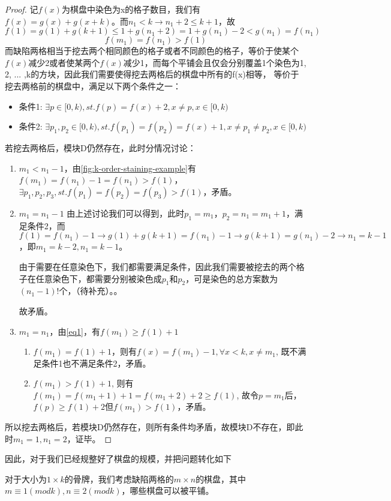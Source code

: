 \begin{proof}
    记$f(x)$为棋盘中染色为x的格子数目，我们有$f(x) = g(x) + g(x + k)$。而$n_1 < k \rightarrow n_1 + 2 \le k + 1$，故
    $f(1) = g(1) + g(k + 1) \le 1 + g(n_1 + 2) = 1 + g(n_1) - 2 < g(n_1) = f(n_1)$
    \begin{equation}
        \label{eq1}
        f(m_1) = f(n_1) > f(1)
    \end{equation}
    而缺陷两格相当于挖去两个相同颜色的格子或者不同颜色的格子，等价于使某个$f(x)$减少2或者使某两个$f(x)$减少1，而每个平铺会且仅会分别覆盖1个染色为1, 2, ... ,k的方块，因此我们需要使得挖去两格后的棋盘中所有的f(x)相等，
    等价于挖去两格前的棋盘中，满足以下两个条件之一：
    \begin{itemize}
        \item 条件1: $\exists p \in [0, k), st. f(p) = f(x) + 2, x \neq p , x \in [0, k)$
        \item 条件2: $\exists p_1, p_2 \in [0, k), st. f(p_1) = f(p_2) = f(x) + 1, x \neq p_1 \neq p_2, x \in [0, k)$
    \end{itemize}

    若挖去两格后，模块D仍然存在，此时分情况讨论：

    \begin{enumerate}
        \item $m_1 < n_1 - 1$，由\ref*{fig:k-order-staining-example}有$f(m_1) = f(n_1) - 1 = f(n_1) > f(1)$，$\exists p_1, p_2, p_3, st. f(p_1) = f(p_2) = f(p_3) > f(1)$，矛盾。
        \item $m_1 = n_1 - 1$ 由上述讨论我们可以得到，此时$p_1 = m_1$，$p_2 = n_1 = m_1 + 1$，满足条件2，而$f(1) = f(n_1) - 1 \rightarrow g(1) + g(k + 1) = f(n_1) - 1 \rightarrow g(k + 1) = g(n_1) - 2 \rightarrow n_1 = k-1$
              ，即$m_1 = k - 2, n_1 = k - 1$。

              由于需要在任意染色下，我们都需要满足条件，因此我们需要被挖去的两个格子在任意染色下，都需要分别被染色成$p_1$和$p_2$，可是染色的总方案数为$(n_1 - 1)!$个，（待补充）。。

              故矛盾。
        \item $m_1 = n_1$，由\ref*{eq1}，有$f(m_1) \ge f(1) + 1$
              \begin{enumerate}
                  \item $f(m_1) = f(1) + 1$，则有$f(x) = f(m_1) - 1, \forall x < k, x \neq m_1$, 既不满足条件1也不满足条件2，矛盾。
                  \item $f(m_1) > f(1) + 1$, 则有$f(m_1) = f(m_1 + 1) + 1 = f(m_1 + 2) + 2 \ge f(1)$, 故令$p = m_1$后，$f(p) \ge f(1) + 2$但$f(m_1) > f(1)$，矛盾。
              \end{enumerate}
    \end{enumerate}
    
    所以挖去两格后，若模块D仍然存在，则所有条件均矛盾，故模块D不存在，即此时$m_1 = 1, n_1 = 2$，证毕。
\end{proof}

因此，对于我们已经规整好了棋盘的规模，并把问题转化如下

对于大小为$1 \times k$的骨牌，我们考虑缺陷两格的$m \times n$的棋盘，其中$m \equiv 1 (mod k), n \equiv 2 (mod k)$，哪些棋盘可以被平铺。

\clearpage